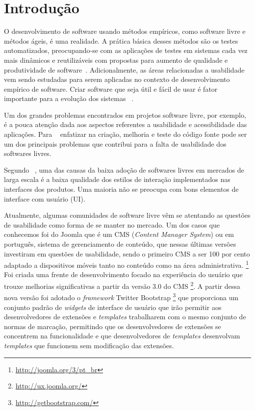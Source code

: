 \chapter{Introdução}

O desenvolvimento de software usando métodos empíricos, como software livre e métodos ágeis, é uma realidade. A prática básica desses métodos são os testes automatizados, preocupando-se com as aplicações de testes em sistemas cada vez mais dinâmicos e reutilizáveis com propostas para aumento de qualidade e produtividade de software~\cite{vicente2010}.
%
Adicionalmente, as áreas relacionadas a usabilidade vem sendo estudadas para serem aplicadas no contexto de desenvolvimento empírico de software. Criar software que seja útil e fácil de usar é fator importante para a evolução dos sistemas ~\cite{santos2012}.

Um dos grandes problemas encontrados em projetos software livre, por exemplo, é a pouca atenção dada aos aspectos referentes a usabilidade e acessibilidade das aplicações. Para ~ enfatizar na criação, melhoria e teste do código fonte pode ser um dos principais problemas que contribui para a falta de usabilidade dos softwares livres.

%
Segundo ~, uma das causas da baixa adoção de softwares livres em mercados de larga escala é a baixa qualidade dos estilos de interação implementados nas interfaces dos produtos. Uma maioria não se preocupa com bons elementos de interface com usuário (UI). 

Atualmente, algumas comunidades de software livre vêm se atentando as questões de usabilidade como forma de se manter no mercado. Um dos casos que conhecemos foi do Joomla que é um CMS (\textit{Content Manager System}) ou em português, sistema de gerenciamento de conteúdo, que nessas últimas versões investiram em questões de usabilidade, sendo o primeiro CMS a ser 100 por cento adaptado a dispositivos móveis tanto no conteúdo como na área administrativa. \footnote{\url{http://joomla.org/3/pt_br}}
Foi criada uma frente de desenvolvimento focado na experiência do usuário que trouxe melhorias significativas a partir da versão 3.0 do CMS \footnote{\url{http://ux.joomla.org/}}. A partir dessa nova versão foi adotado o \textit{framework} Twitter Bootstrap \footnote{\url{http://getbootstrap.com/}} que proporciona um conjunto padrão de \textit{widgets} de interface de usuário que irão permitir aos desenvolvedores de extensões e \textit{templates}  trabalharem com o mesmo conjunto de normas de marcação, permitindo que os desenvolvedores de extensões se concentrem na funcionalidade e que desenvolvedores de \textit{templates} desenvolvam \textit{templates} que funcionem sem modificação das extensões. 


